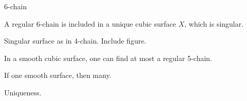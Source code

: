 \documentclass[UKenglish,aspectratio=169]{beamer}
\begin{document}
\begin{frame}{6-chain}
    \begin{theorem}
        A regular 6-chain is included in a unique cubic surface
        $X$, which is singular.
    \end{theorem}
\end{frame}

\begin{frame}
    Singular surface as in 4-chain.
    Include figure.
\end{frame}

\begin{frame}
    \begin{theorem}
        In a smooth cubic surface, one can find at most a regular 5-chain.
    \end{theorem}
\end{frame}

\begin{frame}
    If one smooth surface, then many.
\end{frame}

\begin{frame}
    Uniqueness.
\end{frame}
\end{document}
